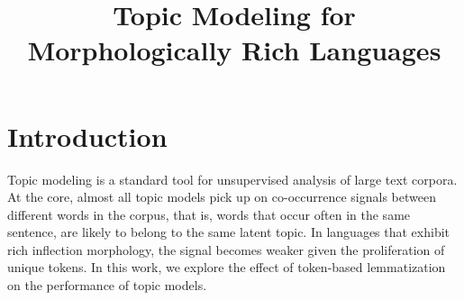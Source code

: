 \documentclass[11pt,letterpaper]{article}
\title{Topic Modeling for Morphologically Rich Languages}
\begin{document}
\maketitle
\begin{abstract}
\end{abstract}

\section{Introduction}\label{sec:introduction}

Topic modeling is a standard tool for unsupervised analysis of large
text corpora. At the core, almost all topic models pick up on
co-occurrence signals between different words in the corpus, that is,
words that occur often in the same sentence, are likely to belong to
the same latent topic. In languages that exhibit rich inflection
morphology, the signal becomes weaker given the proliferation of
unique tokens. In this work, we explore the effect of token-based
lemmatization on the performance of topic models.
\end{document}
